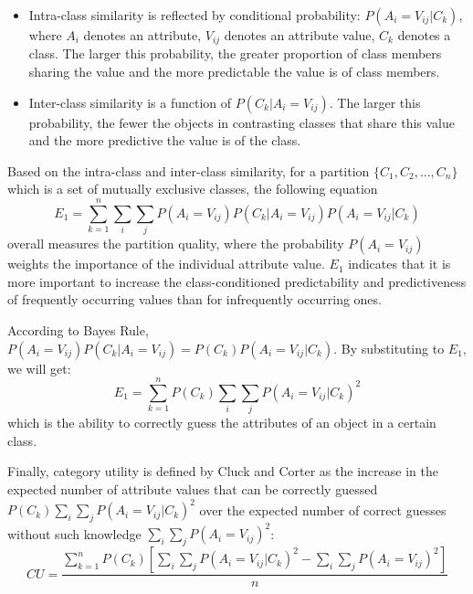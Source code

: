 \begin{itemize}\setlength{\itemsep}{0.01pt}
\item Intra-class similarity is reflected by conditional probability: $P(A_i=V_{ij}\left|C_k\right.)$, where $A_i$ denotes an attribute, $V_{ij}$ denotes an attribute value, $C_k$ denotes a class. The larger this probability, the greater proportion of class members sharing the value and the more predictable the value is of class members\cite{fisher1987knowledge}.
\item Inter-class similarity is a function of $P(C_k|A_i=V_{ij})$. The larger this probability, the fewer the objects in contrasting classes that share this value and the more predictive the value is of the class\cite{fisher1987knowledge}.
\end{itemize}

Based on the intra-class and inter-class similarity, for a partition $\{C_1, C_2,...,C_n\}$ which is a set of mutually exclusive classes, the following equation $$E_1=\sum_{k=1}^{n}\sum_{i}\sum_{j}P(A_i=V_{ij})P(C_k|A_i=V_{ij})P(A_i=V_{ij}\left|C_k\right.)$$ overall measures the partition quality, where the probability $P(A_i=V_{ij})$ weights the importance of the individual attribute value. $E_1$ indicates that it is more important to increase the class-conditioned predictability and predictiveness of frequently occurring values than for infrequently occurring ones\cite{fisher1987knowledge}.

According to Bayes Rule, $ P(A_i=V_{ij})P(C_k|A_i=V_{ij})=P(C_k)P(A_i=V_{ij}|C_k)$. By substituting to $E_{1}$, we will get:$$E_1=\sum_{k=1}^{n}P(C_k)\sum_i \sum_jP(A_i=V_{ij}\left|C_k\right.)^2$$ which is the ability to correctly guess the attributes of an object in a certain class. 

Finally, category utility is defined by Cluck and Corter as the increase in the expected number of attribute values that can be correctly guessed $P(C_k)\sum_i \sum_jP(A_i=V_{ij}\left|C_k\right.)^2$ over the expected
number of correct guesses without such knowledge $\sum_i \sum_jP(A_i=V_{ij})^2$\cite{fisher1987knowledge}:
\begin{equation*}
\label{eq:cu}
CU=\frac{\sum_{k=1}^{n}P(C_k)\left[\sum_i \sum_jP(A_i=V_{ij}\left|C_k\right.)^2-\sum_i \sum_jP(A_i=V_{ij})^2\right]}{n}
\end{equation*}

